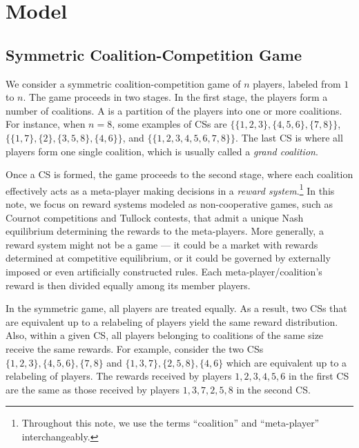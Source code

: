 \documentclass[11pt]{article}
\begin{document}
\section{Model}

\subsection*{Symmetric Coalition-Competition Game}


We consider a symmetric coalition-competition game of $n$ players, labeled from $1$ to $n$.
The game proceeds in two stages. In the first stage, the players form a number of coalitions.
A  is a partition of the players into one or more coalitions.
For instance, when $n=8$, some examples of CSs are $\{\{1,2,3\},\{4,5,6\},\{7,8\}\}$, $\{\{1,7\},\{2\},\{3,5,8\},\{4,6\}\}$,
and $\{\{1,2,3,4,5,6,7,8\}\}$. The last CS is where all players form one single coalition, which is usually called a \emph{grand coalition}.

Once a CS is formed, the game proceeds to the second stage, where each coalition effectively acts as a meta-player making decisions in a
\emph{reward system}.\footnote{Throughout this note, we use the terms ``coalition'' and ``meta-player'' interchangeably.}
In this note, we focus on reward systems modeled as non-cooperative games, such as Cournot competitions and Tullock contests,
that admit a unique Nash equilibrium determining the rewards to the meta-players.
More generally, a reward system might not be a game --- it could be a market with rewards determined at competitive equilibrium,
or it could be governed by externally imposed or even artificially constructed rules.
Each meta-player/coalition's reward is then divided equally among its member players.

In the symmetric game, all players are treated equally. As a result, two CSs that are equivalent up to a relabeling of players yield the same reward distribution.
Also, within a given CS, all players belonging to coalitions of the same size receive the same rewards.
For example, consider the two CSs $\{1,2,3\},\{4,5,6\},\{7,8\}$ and $\{1,3,7\},\{2,5,8\},\{4,6\}$ which are equivalent up to a relabeling of players.
The rewards received by players $1,2,3,4,5,6$ in the first CS are the same as those received by players $1,3,7,2,5,8$ in the second CS.
\end{document}
